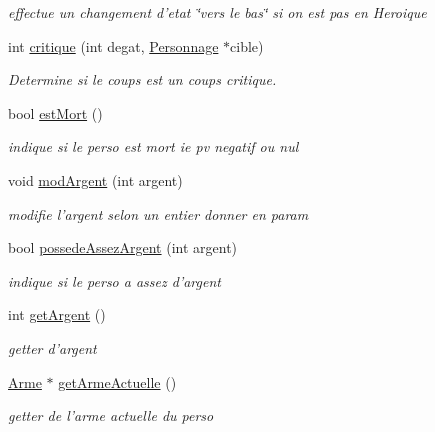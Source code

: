 \begin{DoxyCompactItemize}
\begin{DoxyCompactList}\small\item\em effectue un changement d'etat \char`\"{}vers le bas\char`\"{} si on est pas en Heroique \end{DoxyCompactList}\item 
int \hyperlink{classPersonnage_a0024a1f71a6f0c252be639463ac39c7c}{critique} (int degat, \hyperlink{classPersonnage}{Personnage} $\ast$cible)
\begin{DoxyCompactList}\small\item\em Determine si le coups est un coups critique. \end{DoxyCompactList}\item 
bool \hyperlink{classPersonnage_ad44fed592109b5804b1246f3d6a186f3}{est\-Mort} ()
\begin{DoxyCompactList}\small\item\em indique si le perso est mort ie pv negatif ou nul \end{DoxyCompactList}\item 
void \hyperlink{classPersonnage_a25b1a649e9322aac97ec55630959c8cc}{mod\-Argent} (int argent)
\begin{DoxyCompactList}\small\item\em modifie l'argent selon un entier donner en param \end{DoxyCompactList}\item 
bool \hyperlink{classPersonnage_a9cfba1f94fc07bc9f42fc50901e143f9}{possede\-Assez\-Argent} (int argent)
\begin{DoxyCompactList}\small\item\em indique si le perso a assez d'argent \end{DoxyCompactList}\item 
int \hyperlink{classPersonnage_ab2396463311e9585a42f050273df7751}{get\-Argent} ()
\begin{DoxyCompactList}\small\item\em getter d'argent \end{DoxyCompactList}\item 
\hyperlink{classArme}{Arme} $\ast$ \hyperlink{classPersonnage_ae6268f94bc88685bfab88f15ba3ec9f1}{get\-Arme\-Actuelle} ()
\begin{DoxyCompactList}\small\item\em getter de l'arme actuelle du perso \end{DoxyCompactList}\end{DoxyCompactItemize}


